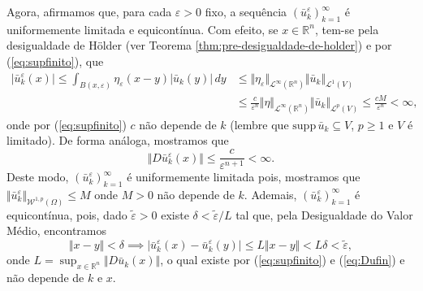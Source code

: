 \documentclass[a4paper, 11pt]{book}
\theoremstyle{definition}
\newcommand{\bR}{\mathbb{R}}
\newcommand{\cL}{\mathcal{L}}
\newcommand{\cW}{\mathcal{W}}
\newcommand{\supp}{\mathrm{supp}\,}
\begin{document}
\begin{prf}
    Agora, afirmamos que, para cada $\varepsilon > 0$ fixo, a sequência $(\bar u_k^\varepsilon)_{k=1}^\infty$ é uniformemente limitada e equicontínua.
    Com efeito, se $x \in \bR^n$, tem-se pela desigualdade de Hölder (ver Teorema \ref{thm:pre-desigualdade-de-holder}) e por (\ref{eq:supfinito}), que
    \begin{equation} \label{eq:ufin}
        \begin{aligned}
            |\bar u_k^\varepsilon(x)| \leqslant \int_{B(x,\varepsilon)} \eta_\varepsilon (x - y) |\bar u_k(y)| \,dy &\leqslant \Vert \eta_\varepsilon \Vert_{\cL^\infty(\bR^n)} \Vert \bar u_k \Vert_{\cL^1(V)}\\ 
            &\leqslant \frac{c}{\varepsilon^n} \Vert \eta \Vert_{\cL^\infty(\bR^n)} \Vert \bar u_k \Vert_{\cL^p(V)} \leqslant \frac{cM}{\varepsilon^n} < \infty,
        \end{aligned}
    \end{equation}
    onde por (\ref{eq:supfinito}) $c$ não depende de $k$ (lembre que $\supp \bar u_k \subseteq V$, $p \geqslant 1$ e $V$ é limitado). De forma análoga, mostramos que
    \begin{equation} \label{eq:Dufin}
        \Vert D\bar u_k^\varepsilon(x) \Vert  \leqslant \frac{c}{\varepsilon^{n+1}} < \infty.
    \end{equation}
    Deste modo, $(\bar u_k^\varepsilon)_{k=1}^\infty$ é uniformemente limitada pois, mostramos que $\Vert \bar u_k^\varepsilon \Vert_{\cW^{1,p}(\Omega)}\leqslant M$ onde $M > 0$ não depende de $k$.
    Ademais, $(\bar u_k^\varepsilon)_{k=1}^\infty$ é equicontínua, pois, dado $\tilde\varepsilon > 0$ existe $\delta < \tilde\varepsilon / L$ tal que, pela Desigualdade do Valor Médio, encontramos
    \[
        \Vert x - y \Vert < \delta \implies |\bar u_k^\varepsilon(x) - \bar u_k^\varepsilon(y)| \leqslant L \Vert x - y \Vert < L \delta < \tilde\varepsilon,
    \]
    onde $L = \sup_{x \in \bR^n} \Vert D\bar u_k(x) \Vert$, o qual existe por (\ref{eq:supfinito}) e (\ref{eq:Dufin}) e não depende de $k$ e $x$.


\end{prf}
\end{document}
